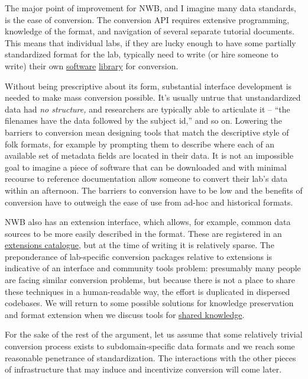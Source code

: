 \documentclass[10pt]{tufte-book}
\begin{document}
The major point of improvement for NWB, and I imagine many data
standards, is the ease of conversion. The conversion API requires
extensive programming, knowledge of the format, and navigation of
several separate tutorial documents. This means that individual labs, if
they are lucky enough to have some partially standardized format for the
lab, typically need to write (or hire someone to write) their own
\href{https://github.com/catalystneuro/tank-lab-to-nwb}{software}
\href{https://github.com/catalystneuro/mease-lab-to-nwb}{library} for
conversion.

Without being prescriptive about its form, substantial interface
development is needed to make mass conversion possible. It's usually
untrue that unstandardized data had \emph{no structure,} and researchers
are typically able to articulate it -- ``the filenames have the data
followed by the subject id,'' and so on. Lowering the barriers to
conversion mean designing tools that match the descriptive style of folk
formats, for example by prompting them to describe where each of an
available set of metadata fields are located in their data. It is not an
impossible goal to imagine a piece of software that can be downloaded
and with minimal recourse to reference documentation allow someone to
convert their lab's data within an afternoon. The barriers to conversion
have to be low and the benefits of conversion have to outweigh the ease
of use from ad-hoc and historical formats.

NWB also has an extension interface, which allows, for example, common
data sources to be more easily described in the format. These are
registered in an \href{https://nwb-extensions.github.io/}{extensions
catalogue}, but at the time of writing it is relatively sparse. The
preponderance of lab-specific conversion packages relative to extensions
is indicative of an interface and community tools problem: presumably
many people are facing similar conversion problems, but because there is
not a place to share these techniques in a human-readable way, the
effort is duplicated in dispersed codebases. We will return to some
possible solutions for knowledge preservation and format extension when
we discuss tools for \protect\hyperlink{shared-knowledge}{shared
knowledge}.

For the sake of the rest of the argument, let us assume that some
relatively trivial conversion process exists to subdomain-specific data
formats and we reach some reasonable penetrance of standardization. The
interactions with the other pieces of infrastructure that may induce and
incentivize conversion will come later.
\end{document}

